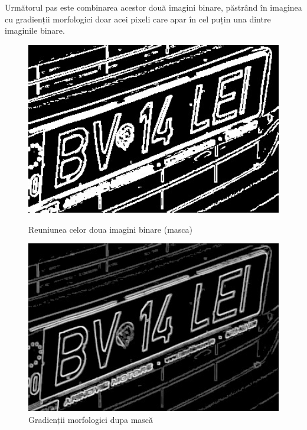 \documentclass[a4paper,12pt]{report}
\begin{document}
Următorul pas este combinarea acestor două imagini binare, păstrând în imaginea cu gradienții morfologici doar acei pixeli care apar în cel puțin una dintre imaginile binare.

\begin{figure}[h]
    \centering
    \begin{minipage}{0.4\textwidth}
        \centering
        \includegraphics[width=1\textwidth]{images/or_binary.jpg}
        \caption{Reuniunea celor doua imagini binare (masca)}
    \end{minipage}
    \hspace{0.05\textwidth}
    \begin{minipage}{0.4\textwidth}
        \centering
        \includegraphics[width=1\textwidth]{images/or_gradient.jpg}
        \caption{Gradienții morfologici dupa mască}
    \end{minipage}
\end{figure}
\FloatBarrier
\end{document}
